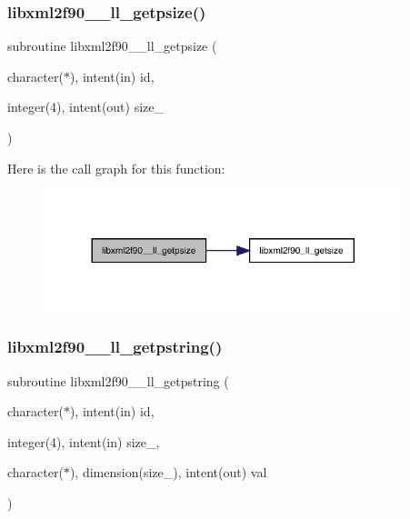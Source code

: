 \subsubsection{\texorpdfstring{libxml2f90\+\_\+\+\_\+ll\+\_\+getpsize()}{libxml2f90\_\_ll\_getpsize()}}
{\footnotesize\ttfamily subroutine libxml2f90\+\_\+\+\_\+ll\+\_\+getpsize (\begin{DoxyParamCaption}\item[{character($\ast$), intent(in)}]{id,  }\item[{integer(4), intent(out)}]{size\+\_\+ }\end{DoxyParamCaption})}

Here is the call graph for this function\+:
\nopagebreak
\begin{figure}[H]
\begin{center}
\leavevmode
\includegraphics[width=296pt]{libxml2f90_8f90__pp_8f90_ab594e6f189158ab0e2fc4db0d03392ad_cgraph}
\end{center}
\end{figure}
\mbox{\label{libxml2f90_8f90__pp_8f90_a956943680a07e3d0179b205f6209d9cb}} 
\subsubsection{\texorpdfstring{libxml2f90\+\_\+\+\_\+ll\+\_\+getpstring()}{libxml2f90\_\_ll\_getpstring()}}
{\footnotesize\ttfamily subroutine libxml2f90\+\_\+\+\_\+ll\+\_\+getpstring (\begin{DoxyParamCaption}\item[{character($\ast$), intent(in)}]{id,  }\item[{integer(4), intent(in)}]{size\+\_\+,  }\item[{character($\ast$), dimension(size\+\_\+), intent(out)}]{val }\end{DoxyParamCaption})}

